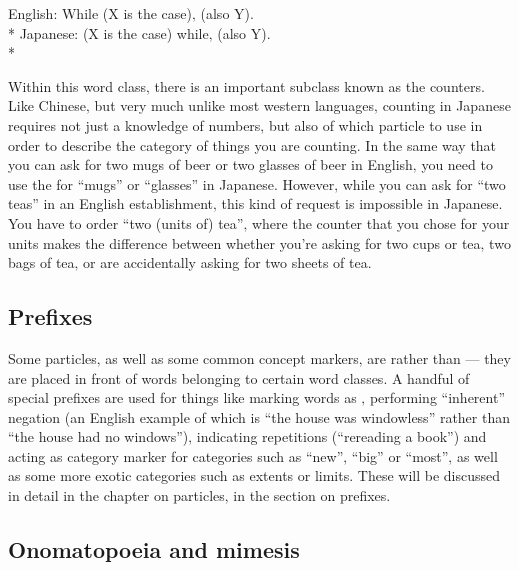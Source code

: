 \documentclass[11pt, b5paper, twoside, openright, onecolumn]{book}
\newenvironment{exampleblock}{
\setlength{\parindent}{0.6in}
\begin{minipage}[t]{\dimexpr\textwidth-\parindent}}
{\end{minipage}}
\begin{document}
\vspace{0.4cm}
\begin{exampleblock}
English: While (X is the case)‚ (also Y). \\* 
Japanese: (X is the case) while‚ (also Y). \\* 
\end{exampleblock}
\vspace{0.2cm}

Within this word class‚ there is an important subclass known as the counters. Like Chinese‚ but very much unlike most western languages‚ counting in Japanese requires not just a knowledge of numbers‚ but also of which particle to use in order to describe the category of things you are counting. In the same way that you can ask for two mugs of beer or two glasses of beer in English‚ you need to use the  for “mugs” or “glasses” in Japanese. However‚ while you can ask for “two teas” in an English establishment‚ this kind of request is impossible in Japanese. You have to order “two (units of) tea”‚ where the counter that you chose for your units makes the difference between whether you’re asking for two cups or tea‚ two bags of tea‚ or are accidentally asking for two sheets of tea.

\subsection{Prefixes}

Some particles‚ as well as some common concept markers‚ are  rather than  — they are placed in front of words belonging to certain word classes. A handful of special prefixes are used for things like marking words as ‚ performing “inherent” negation (an English example of which is “the house was windowless” rather than “the house had no windows”)‚ indicating repetitions (“rereading a book”) and acting as category marker for categories such as “new”‚ “big” or “most”‚ as well as some more exotic categories such as extents or limits. These will be discussed in detail in the chapter on particles‚ in the section on prefixes.

\subsection{Onomatopoeia and mimesis}
\end{document}
